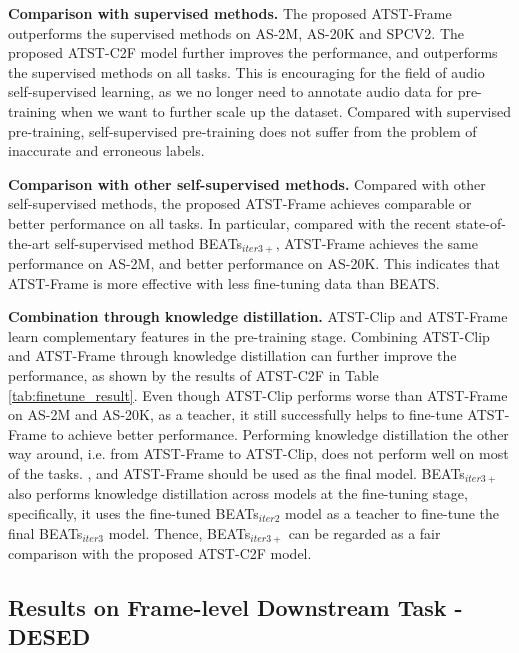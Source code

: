 \textbf{Comparison with supervised methods.} The proposed ATST-Frame outperforms the supervised methods on AS-2M, AS-20K and SPCV2. The proposed ATST-C2F model further improves the performance, and outperforms the supervised methods on all tasks. This is encouraging for the field of audio self-supervised learning, as we no longer need to annotate audio data for pre-training when we want to further scale up the dataset. Compared with supervised pre-training, self-supervised pre-training does not suffer from the problem of inaccurate and erroneous labels.


\textbf{Comparison with other self-supervised methods.} Compared with other self-supervised methods, the proposed ATST-Frame achieves comparable or better performance on all tasks. In particular, compared with the recent state-of-the-art self-supervised method BEATs$_{iter3+}$\cite{chen_beats_2022}, ATST-Frame achieves the same performance on AS-2M, and better performance on AS-20K. This indicates that ATST-Frame is more effective with less fine-tuning data than BEATS. 

\textbf{Combination through knowledge distillation.} 
ATST-Clip and ATST-Frame learn complementary features in the pre-training stage. Combining ATST-Clip and ATST-Frame through knowledge distillation can further improve the performance, as shown by the results of ATST-C2F in Table \ref{tab:finetune_result}. Even though ATST-Clip performs worse than ATST-Frame on AS-2M and AS-20K, as a teacher, it still successfully helps to fine-tune ATST-Frame to achieve better performance. 
Performing knowledge distillation the other way around, i.e. from ATST-Frame to ATST-Clip, does not perform well on most of the tasks. 
, and ATST-Frame should be used as the final model.
BEATs$_{iter3+}$\cite{chen_beats_2022} also performs knowledge distillation across models at the fine-tuning stage, specifically, it uses the fine-tuned BEATs$_{iter2}$ model as a teacher to fine-tune the final BEATs$_{iter3}$ model. Thence, BEATs$_{iter3+}$ can be regarded as a fair comparison with the proposed ATST-C2F model.


\subsection{Results on Frame-level Downstream Task - DESED}
\label{sec:dcase}

